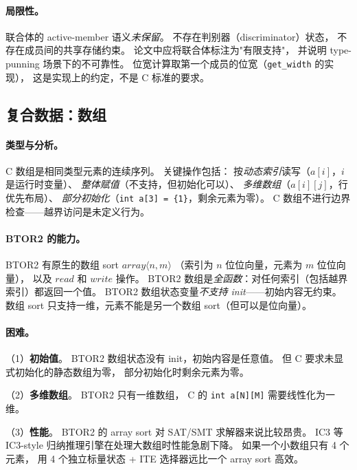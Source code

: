 \documentclass[11pt,a4paper]{article}
\begin{document}
\paragraph{局限性。}
联合体的 active-member 语义\emph{未保留}。
不存在判别器（discriminator）状态，
不存在成员间的共享存储约束。
论文中应将联合体标注为"有限支持"，
并说明 type-punning 场景下的不可靠性。
位宽计算取第一个成员的位宽（\texttt{get\_width} 的实现），
这是实现上的约定，不是 C 标准的要求。


\subsection{复合数据：数组}
\label{sec:array}

\paragraph{类型与分析。}
C 数组是相同类型元素的连续序列。
关键操作包括：
按\emph{动态索引}读写（$a[i]$，$i$ 是运行时变量）、
\emph{整体赋值}（不支持，但初始化可以）、
\emph{多维数组}（$a[i][j]$，行优先布局）、
\emph{部分初始化}（\texttt{int a[3] = \{1\}}，剩余元素为零）。
C 数组不进行边界检查——越界访问是未定义行为。

\paragraph{BTOR2 的能力。}
BTOR2 有原生的数组 sort $\mathit{array}\langle n, m \rangle$
（索引为 $n$ 位位向量，元素为 $m$ 位位向量），
以及 $\mathit{read}$ 和 $\mathit{write}$ 操作。
BTOR2 数组是\emph{全函数}：对任何索引（包括越界索引）都返回一个值。
BTOR2 数组状态变量\emph{不支持 init}——初始内容无约束。
数组 sort 只支持一维，元素不能是另一个数组 sort（但可以是位向量）。

\paragraph{困难。}
（1）\textbf{初始值}。
BTOR2 数组状态没有 init，初始内容是任意值。
但 C 要求未显式初始化的静态数组为零，
部分初始化时剩余元素为零。

（2）\textbf{多维数组}。
BTOR2 只有一维数组，
C 的 \texttt{int a[N][M]} 需要线性化为一维。

（3）\textbf{性能}。
BTOR2 的 array sort 对 SAT/SMT 求解器来说比较昂贵。
IC3 等 IC3-style 归纳推理引擎在处理大数组时性能急剧下降。
如果一个小数组只有 4 个元素，
用 4 个独立标量状态 + ITE 选择器远比一个 array sort 高效。
\end{document}

